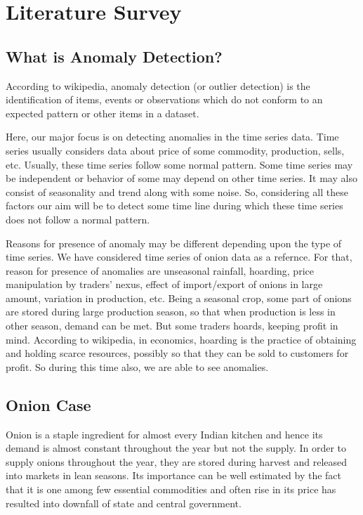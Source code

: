 \chapter{Literature Survey}


\section{What is Anomaly Detection?}

According to wikipedia, anomaly detection (or outlier detection) is the identification of items, events or observations which do not conform to an expected pattern or other items in a dataset.

Here, our major focus is on detecting anomalies in the time series data. Time series usually considers data about price of some commodity, production, sells, etc. Usually, these time series follow some normal pattern. Some time series may be independent or behavior of some may depend on other time series. It may also consist of seasonality and trend along with some noise. So, considering all these factors our aim will be to detect some time line during which these time series does not follow a normal pattern.

Reasons for presence of anomaly may be different depending upon the type of time series. We have considered time series of onion data as a refernce. For that, reason for presence of anomalies are unseasonal rainfall, hoarding, price manipulation by traders' nexus, effect of import/export of onions in large amount, variation in production, etc. Being a seasonal crop, some part of onions are stored during large production season, so that when production is less in other season, demand can be met. But some traders hoards, keeping profit in mind. According to wikipedia, in economics, hoarding is the practice of obtaining and holding scarce resources, possibly so that they can be sold to customers for profit. So during this time also, we are able to see anomalies.


\section{Onion Case}


Onion is a staple ingredient for almost every Indian kitchen and hence its demand is almost constant throughout the year but not the supply. In order to supply onions throughout the year, they are stored during harvest and released into markets in lean seasons. Its importance can be well estimated by the fact that it is one among few essential commodities and often rise in its price has resulted into downfall of state and central government.

